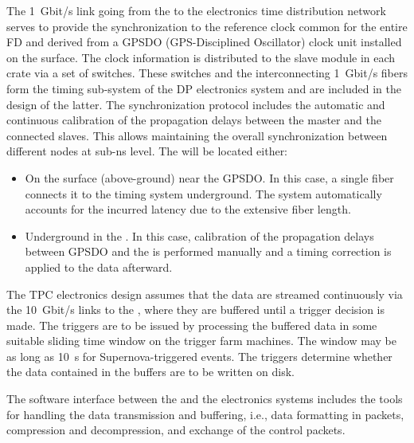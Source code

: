 The \SI{1}{Gbit/s} link going from the  to the \dual electronics time distribution network serves to provide the synchronization to the reference clock common for the entire FD and derived from a GPSDO (GPS-Disciplined Oscillator) clock unit installed on the surface. The clock information is distributed to the  slave module in each  crate via a set of  switches. These switches and the interconnecting \SI{1}{Gbit/s} fibers form the timing sub-system of the DP electronics system and are included in the design of the latter. The  synchronization protocol includes the automatic and continuous calibration of the propagation delays between the master and the connected slaves. This allows maintaining the overall synchronization between different nodes at sub-ns level. The  %
will be located either:
\begin{itemize}
\item{On the surface (above-ground) near the GPSDO. In this case, a single fiber connects it to the \dual timing system underground. %
The system automatically accounts for the incurred latency due to the extensive 
 fiber length.}
\item{Underground in the . In this case, calibration of the propagation delays between GPSDO and the  is performed manually and a timing correction %
is applied to the data afterward.}
\end{itemize} 

The TPC electronics design assumes that the data are streamed continuously via the \SI{10}{Gbit/s} links to the , where they are buffered until a trigger decision %
is made. The triggers are to be issued by processing the buffered data in some suitable sliding time window on the trigger farm machines. 
The window may be as long as \SI{10}{s} for Supernova-triggered events.
The triggers determine whether the data contained in the buffers are to be written on disk. 

The software interface between the  and the electronics systems 
  includes the tools for handling the data transmission and buffering, i.e.,  data formatting in  packets, compression and decompression, and exchange of the control packets.

